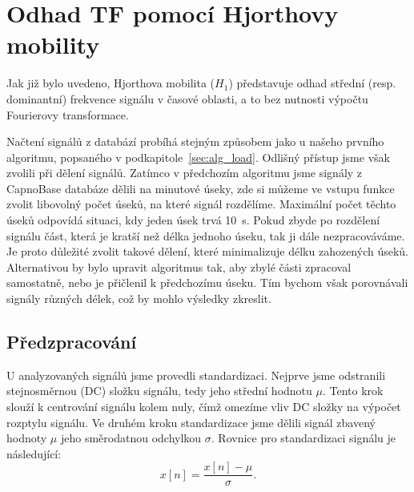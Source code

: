 \section{Odhad TF pomocí Hjorthovy mobility}
\label{sec:hjorth_mobilita_tf}
Jak již bylo uvedeno, Hjorthova mobilita (\( H_1 \)) představuje odhad střední (resp. dominantní) frekvence signálu v časové oblasti, a to bez nutnosti výpočtu Fourierovy transformace.

Načtení signálů z databází probíhá stejným způsobem jako u našeho prvního algoritmu, popsaného v podkapitole~\ref{sec:alg_load}.
Odlišný přístup jsme však zvolili při dělení signálů.
Zatímco v předchozím algoritmu jsme signály z CapnoBase databáze dělili na minutové úseky, zde si můžeme ve vstupu funkce zvolit libovolný počet úseků, na které signál rozdělíme.
Maximální počet těchto úseků odpovídá situaci, kdy jeden úsek trvá 10~s.
Pokud zbyde po rozdělení signálu část, která je kratší než délka jednoho úseku, tak ji dále nezpracováváme.
Je proto důležité zvolit takové dělení, které minimalizuje délku zahozených úseků.
Alternativou by bylo upravit algoritmus tak, aby zbylé části zpracoval samostatně, nebo je přičlenil k předchozímu úseku.
Tím bychom však porovnávali signály různých délek, což by mohlo výsledky zkreslit.

\subsection*{Předzpracování}
\label{sec:predzpracovani}
U analyzovaných signálů jsme provedli standardizaci.
Nejprve jsme odstranili stejnosměrnou (\acs{DC}) složku signálu, tedy jeho střední hodnotu \(\mu\).
Tento krok slouží k centrování signálu kolem nuly, čímž omezíme vliv \acs{DC} složky na výpočet rozptylu signálu.
Ve druhém kroku standardizace jsme dělili signál zbavený hodnoty \(\mu\) jeho směrodatnou odchylkou \(\sigma\).
Rovnice pro standardizaci signálu je následující:
\begin{equation}
	\label{eq:standardizace}
	x[n] = \frac{x[n] - \mu}{\sigma}.
\end{equation}

